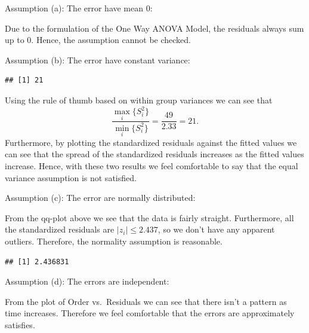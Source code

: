 \documentclass[12pt,]{article}
\newenvironment{Shaded}{\begin{snugshade}}{\end{snugshade}}
\newcommand{\KeywordTok}[1]{\textcolor[rgb]{0.13,0.29,0.53}{\textbf{#1}}}
\newcommand{\StringTok}[1]{\textcolor[rgb]{0.31,0.60,0.02}{#1}}
\newcommand{\OperatorTok}[1]{\textcolor[rgb]{0.81,0.36,0.00}{\textbf{#1}}}
\newcommand{\NormalTok}[1]{#1}
\begin{document}
Assumption (a): The error have mean 0:

Due to the formulation of the One Way ANOVA Model, the residuals always
sum up to 0. Hence, the assumption cannot be checked.

Assumption (b): The error have constant variance:

\begin{Shaded}
\end{Shaded}

\begin{verbatim}
## [1] 21
\end{verbatim}

Using the rule of thumb based on within group variances we can see that
\[\frac{\max_i\{S_i^2 \}}{\min_i\{S_i^2 \}} =\frac{49}{2.33} = 21.\]
Furthermore, by plotting the standardized residuals against the fitted
values we can see that the spread of the standardized residuals
increases as the fitted values increase. Hence, with these two results
we feel comfortable to say that the equal variance assumption is not
satisfied.

Assumption (c): The error are normally distributed:

From the qq-plot above we see that the data is fairly straight.
Furthermore, all the standardized residuals are \(|z_i| \leq 2.437\), so
we don't have any apparent outliers. Therefore, the normality assumption
is reasonable.

\begin{Shaded}
\end{Shaded}

\begin{verbatim}
## [1] 2.436831
\end{verbatim}

Assumption (d): The errors are independent:

From the plot of Order vs.~Residuals we can see that there isn't a
pattern as time increases. Therefore we feel comfortable that the errors
are approximately satisfies.
\end{document}
